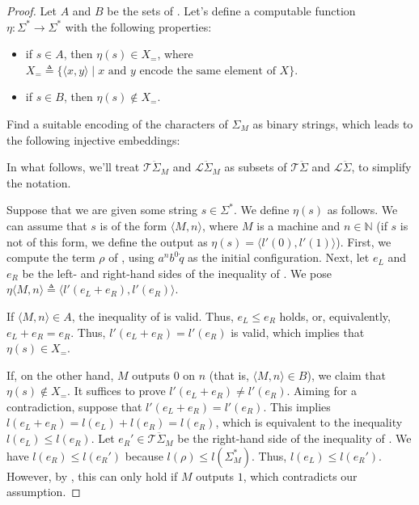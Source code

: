\documentclass[a4paper,UKenglish,cleveref, autoref, thm-restate]{lipics-v2021}
\begin{document}
\begin{proof}
  Let $A$ and $B$ be the sets of .  Let's define
  a computable function $\eta : \Sigma^* \to \Sigma^*$ with the following
  properties:
  \begin{itemize}
  \item if $s \in A$, then $\eta(s) \in X_{=}$, where
    $X_{=} \triangleq \{\langle x, y \rangle \mid \text{$x$ and $y$ encode the
      same element of $X$}\}$.
  \item if $s \in B$, then $\eta(s) \notin X_{=}$.
  \end{itemize}
  Find a suitable encoding of the characters of $ \Sigma_M$ as binary strings,
  which leads to the following injective embeddings:
  \begin{center}
  \end{center}
  In what follows, we'll treat $\mathcal{T}\ddot{\Sigma}_M$ and
  $\mathcal{L}\ddot{\Sigma}_M$ as subsets of $\mathcal{T}\ddot{\Sigma}$ and
  $\mathcal{L}\ddot{\Sigma}$, to simplify the notation.

  Suppose that we are given some string $s \in \Sigma^*$.  We define $\eta(s)$
  as follows.  We can assume that $s$ is of the form $ \langle M, n \rangle$,
  where $M$ is a machine and $n \in \mathbb{N}$ (if $s$ is not of this form, we
  define the output as $\eta(s) = \langle l'(0), l'(1)\rangle $).  First, we
  compute the term $\rho$ of , using $a^nb^0\dot{q}$ as
  the initial configuration.  Next, let $e_L$ and $e_R$ be the left- and
  right-hand sides of the inequality of .  We pose
  \( \eta\langle M , n \rangle \triangleq \langle l'(e_L+e_R),l'(e_R)\rangle.
  \)

  If $\langle M, n \rangle \in A$, the inequality of  is
  valid.  Thus, $e_L \le e_R$ holds, or, equivalently, $e_L + e_R = e_R$.  Thus,
  $l'(e_L+e_R) = l'(e_R)$ is valid, which implies that $\eta(s) \in X_{=}$.

  If, on the other hand, $M$ outputs $0$ on $n$ (that is,
  $\langle M, n \rangle \in B$), we claim that $\eta(s) \notin X_{=}$.  It
  suffices to prove $l'(e_L+e_R) \neq l'(e_R)$. Aiming for a contradiction,
  suppose that $l'(e_L+e_R) = l'(e_R)$. This implies
  $l(e_L+e_R) = l(e_L) + l(e_R) = l(e_R)$, which is equivalent to the inequality
  $l(e_L) \le l(e_R)$.  Let $e_R' \in \mathcal{T}\ddot{\Sigma}_M$ be the
  right-hand side of the inequality of .  We have
  $l(e_R) \le l(e_R')$ because $l(\rho) \le l(\Sigma_M^*)$.  Thus,
  $l(e_L) \le l(e_R')$.  However, by , this can only hold if
  $M$ outputs $1$, which contradicts our assumption.


\end{proof}
\end{document}
